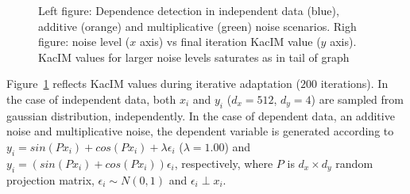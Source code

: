 \documentclass{article}
\begin{document}
\begin{figure}%
	\centering
	\qquad
	\caption{Left figure: Dependence detection in independent data (blue), additive (orange) and multiplicative (green) noise scenarios. Righ figure: noise level ($x$ axis) vs final iteration KacIM value ($y$ axis). KacIM values for larger noise levels saturates as in tail of graph}
	\label{fig:experiments_simulation}
\end{figure}

Figure~\ref{fig:experiments_simulation} reflects KacIM values during iterative adaptation ($200$ iterations). In the case of independent data, both $x_{i}$ and $y_{i}$ ($d_{x} = 512$, $d_{y} = 4$) are sampled from gaussian distribution, independently. In the case of dependent data, an additive noise and multiplicative noise, the dependent variable is generated according to $y_{i} = sin(P x_{i}) + cos(P x_{i}) + \lambda \epsilon_{i}$ ($\lambda = 1.00$) and $y_{i} = (sin(P x_{i}) + cos(P x_{i})) \epsilon_{i}$, respectively, where $P$ is $d_{x} \times d_{y}$ random projection matrix, $\epsilon_{i} \sim N(0,1)$ and $\epsilon_{i} \perp x_{i}$.
\end{document}
